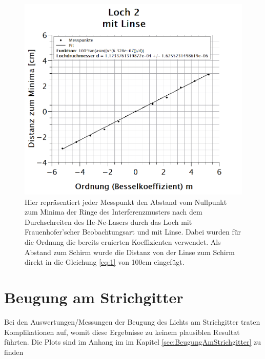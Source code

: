 \begin{figure}[h]
\centering
\includegraphics[width=\textwidth]{Bilder/loch2_mitLinse.png}  
\caption[Loch 2: mit Linse]{Hier repräsentiert jeder Messpunkt den Abstand vom Nullpunkt zum Minima der Ringe des Interferenzmusters nach dem Durchschreiten des He-Ne-Lasers durch das Loch mit Frauenhofer'scher Beobachtungsart und mit Linse. Dabei wurden für die Ordnung die bereits eruierten Koeffizienten verwendet. Als Abstand zum Schirm wurde die Distanz von der Linse zum Schirm direkt in die Gleichung \ref{eq:1} von 100cm eingefügt.}
\label{fig:loch2_mitLinse}
\end{figure}

\section{Beugung am Strichgitter}
Bei den Auswertungen/Messungen der Beugung des Lichts am Strichgitter traten Komplikationen auf, womit diese Ergebnisse zu keinem plausiblen Resultat führten. Die Plots sind im Anhang im im Kapitel \ref{sec:BeugungAmStrichgitter}  zu finden
\newpage